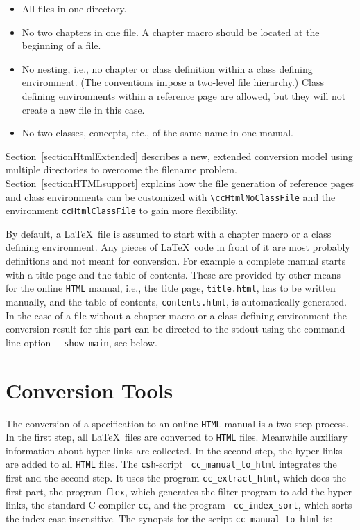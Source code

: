 \documentclass[11pt]{article}
\newcommand{\Dindex}[1]{#1\index{#1}}
\begin{document}
\begin{itemize}
  \item
    All files in one directory.
  \item
    No two chapters in one file. A chapter macro should be located at
    the beginning of a file.
  \item
    No nesting, i.e., no chapter or class definition within a class
    defining environment. (The conventions impose a two-level file
    hierarchy.) Class defining environments within a reference page
    are allowed, but they will not create a new file in this case.
  \item
    No two classes, concepts, etc., of the same name in one manual.
\end{itemize}

Section~\ref{sectionHtmlExtended} describes a new, extended conversion
model using multiple directories to overcome the filename problem.
Section~\ref{sectionHTMLsupport} explains how the file generation of
reference pages and class environments can be customized with
\verb+\ccHtmlNoClassFile+ and the environment {\tt ccHtmlClassFile} to
gain more flexibility.

By default, a \LaTeX\ file is assumed to start with a chapter macro or
a class defining environment. Any pieces of \LaTeX\ code in front of
it are most probably definitions and not meant for conversion. For
example a complete manual starts with a title page and the table of
contents. These are provided by other means for the online {\tt HTML}
manual, i.e., the title page, {\tt title.html}, has to be written
manually, and the table of contents, {\tt contents.html}, is
automatically generated.  In the case of a file without a chapter
macro or a class defining environment the conversion result for this
part can be directed to the stdout using the command line option {\tt
  -show\_main}, see below.


\section{Conversion Tools}

The conversion of a specification to an online {\tt HTML} manual is a
two step process. In the first step, all \LaTeX\ files are converted
to {\tt HTML} files. Meanwhile auxiliary information about
\Dindex{hyper-links} are collected.  In the second step, the hyper-links
are added to all {\tt HTML} files.  The {\tt csh}-script {\tt
  cc\_manual\_to\_html} integrates the first and the second step. It
uses the program {\tt cc\_extract\_html}, which does the first part,
the program {\tt flex}, which generates the filter program to add the
hyper-links, the standard C compiler {\tt cc}, and the program {\tt
  cc\_index\_sort}, which sorts the index case-insensitive. The
synopsis for the script {\tt cc\_manual\_to\_html} is:
\end{document}
